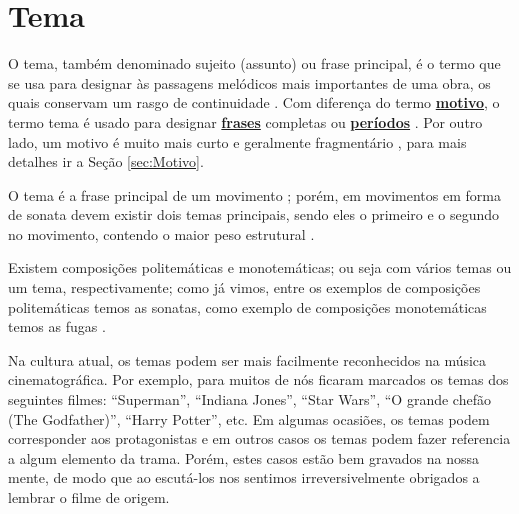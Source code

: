 \section{Tema}
\label{sec:tema}

O tema, também denominado sujeito (assunto) ou frase principal,
é o termo que se usa para designar às passagens melódicos mais importantes de uma obra, 
os quais conservam um rasgo de continuidade \cite[pp. 411]{stainer2009dictionary} \cite[pp. 1496]{latham2008diccionario}.
Com diferença do termo \hyperref[sec:Motivo]{\textbf{motivo}},
o termo tema é usado para designar \hyperref[sec:Frase]{\textbf{frases}} completas 
ou \hyperref[sec:Periodo]{\textbf{períodos}} \cite[pp. 1496]{latham2008diccionario}.
Por outro lado, um motivo é muito mais curto e geralmente fragmentário \cite[pp. 545]{apel1969harvard},
para mais detalhes ir a Seção \ref{sec:Motivo}.

O tema é a frase principal de um movimento \cite[pp. 411]{stainer2009dictionary};
porém, em movimentos em forma de sonata 
devem existir dois  temas principais, sendo eles o primeiro e o segundo no movimento, 
contendo o maior peso estrutural \cite[pp. 411]{stainer2009dictionary} \cite[pp. 1496]{latham2008diccionario}.

Existem composições politemáticas e monotemáticas;
ou seja com vários temas ou um tema, respectivamente; 
como já vimos, entre os exemplos de composições politemáticas
temos as sonatas, como exemplo de composições monotemáticas temos as fugas \cite[pp. 539]{apel1969harvard}.

\begin{example}
Na cultura atual, os temas podem ser mais facilmente reconhecidos  na música cinematográfica.
Por exemplo, para muitos de nós ficaram marcados os temas dos seguintes filmes: ``Superman'', ``Indiana Jones'',
``Star Wars'', ``O grande chefão (The Godfather)'', ``Harry Potter'', etc.
Em algumas ocasiões, os temas podem corresponder aos protagonistas 
e em outros casos os temas podem fazer referencia a algum elemento da trama.
Porém, estes casos estão bem gravados na nossa mente, 
de modo que ao escutá-los nos sentimos irreversivelmente obrigados a lembrar o filme de origem.
\end{example}
